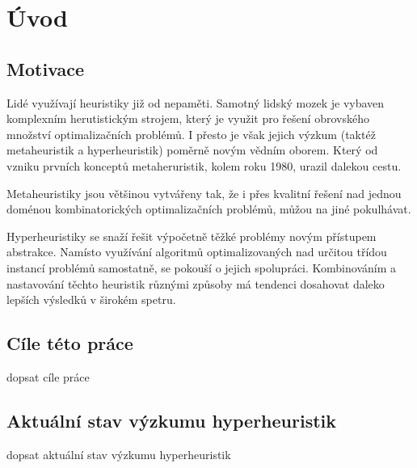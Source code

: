 \chapter{Úvod}
\setcounter{page}{1}

\section{Motivace}

Lidé využívají heuristiky již od nepaměti. Samotný lidský mozek je vybaven komplexním herutistickým strojem, který je využit pro řešení obrovského množství optimalizačních problémů. I přesto je však jejich výzkum (taktéž metaheuristik a hyperheuristik) poměrně novým vědním oborem. Který od vzniku prvních konceptů metaheruristik, kolem roku 1980, urazil dalekou cestu.\cite{sorensen2017}

Metaheuristiky jsou většinou vytvářeny tak, že i přes kvalitní řešení nad jednou doménou kombinatorických optimalizačních problémů, můžou na jiné pokulhávat.

Hyperheuristiky se snaží řešit výpočetně těžké problémy novým přístupem abstrakce. Namísto využívání algoritmů optimalizovaných nad určitou třídou instancí problémů samostatně, se pokouší o jejich spolupráci. Kombinováním a nastavování těchto heuristik různými způsoby má tendenci dosahovat daleko lepších výsledků v širokém spetru.\cite{lehrbaum2011}

\section{Cíle této práce}

dopsat cíle práce


\section{Aktuální stav výzkumu hyperheuristik}

dopsat aktuální stav výzkumu hyperheuristik

